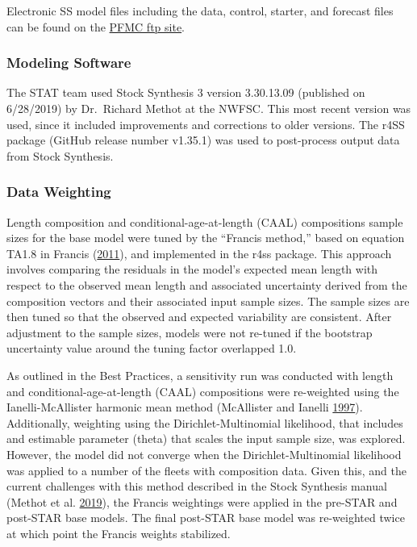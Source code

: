 \documentclass[12pt,]{article}
\begin{document}
Electronic SS model files including the data, control, starter, and
forecast files can be found on the
\href{ftp://ftp.pcouncil.org/pub/!2019\%20GF\%20STAR\%20Panels/STAR\%20Panel\%204\%20-\%20Cowcod-Gopher/}{PFMC
ftp site}.

\subsubsection{Modeling Software}\label{modeling-software}

The STAT team used Stock Synthesis 3 version 3.30.13.09 (published on
6/28/2019) by Dr.~Richard Methot at the NWFSC. This most recent version
was used, since it included improvements and corrections to older
versions. The r4SS package (GitHub release number v1.35.1) was used to
post-process output data from Stock Synthesis.

\subsubsection{Data Weighting}\label{data-weighting}

Length composition and conditional-age-at-length (CAAL) compositions
sample sizes for the base model were tuned by the ``Francis method,''
based on equation TA1.8 in Francis
(\protect\hyperlink{ref-Francis2011}{2011}), and implemented in the r4ss
package. This approach involves comparing the residuals in the model's
expected mean length with respect to the observed mean length and
associated uncertainty derived from the composition vectors and their
associated input sample sizes. The sample sizes are then tuned so that
the observed and expected variability are consistent. After adjustment
to the sample sizes, models were not re-tuned if the bootstrap
uncertainty value around the tuning factor overlapped 1.0.

As outlined in the Best Practices, a sensitivity run was conducted with
length and conditional-age-at-length (CAAL) compositions were
re-weighted using the Ianelli-McAllister harmonic mean method
(McAllister and Ianelli \protect\hyperlink{ref-McAllister1997}{1997}).
Additionally, weighting using the Dirichlet-Multinomial likelihood, that
includes and estimable parameter (theta) that scales the input sample
size, was explored. However, the model did not converge when the
Dirichlet-Multinomial likelihood was applied to a number of the fleets
with composition data. Given this, and the current challenges with this
method described in the Stock Synthesis manual (Methot et al.
\protect\hyperlink{ref-Methot2019}{2019}), the Francis weightings were
applied in the pre-STAR and post-STAR base models. The final post-STAR
base model was re-weighted twice at which point the Francis weights
stabilized.
\end{document}
